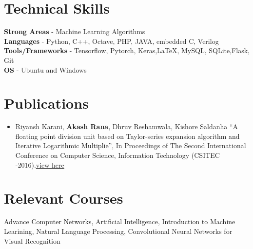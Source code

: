 \documentclass[margin, centered]{res}
\begin{document}
\begin{resume}
\section{Technical \hspace{2mm} Skills}
\textbf{Strong Areas} - Machine Learning Algorithms\\
\textbf{Languages} - Python, C++, Octave, PHP, JAVA, embedded C, Verilog\\
\textbf{Tools/Frameworks} - Tensorflow, Pytorch, Keras,\LaTeX, MySQL, SQLite,Flask, Git\\
\textbf{OS} - Ubuntu and Windows 
\section{Publications}
\begin{itemize}[leftmargin=*]
\item Riyansh Karani, \textbf{Akash Rana}, Dhruv Reshamwala, Kishore Saldanha ``A floating point division unit based on Taylor-series expansion algorithm and Iterative Logarithmic Multiplie'', In Proceedings
of The Second International Conference on Computer Science, Information Technology (CSITEC -2016).\href{http://airccj.org/CSCP/vol6/csit65903.pdf}{view here}
\end{itemize}

\section{Relevant \hspace{2mm} Courses}
Advance Computer Networks, Artificial Intelligence, Introduction to Machine Learining, Natural Language Processing, Convolutional Neural Networks for Visual Recognition 



\end{resume}
\end{document}
